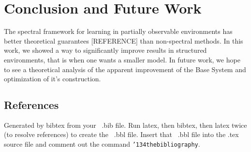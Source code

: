 \documentclass{acm_proc_article-sp}
\begin{document}

\section{Conclusion and Future Work}
The spectral framework for learning in partially observable environments has better theoretical guarantees [REFERENCE] than non-spectral methods. In this work, we showed a way to significantly improve results in structured environments, that is when one wants a smaller model. In future work, we hope to see a theoretical analysis of the apparent improvement of the Base System and optimization of it's construction.

%

%
\subsection{References}
Generated by bibtex from your ~.bib file.  Run latex,
then bibtex, then latex twice (to resolve references)
to create the ~.bbl file.  Insert that ~.bbl file into
the .tex source file and comment out
the command \texttt{{\char'134}thebibliography}.
\end{document}
